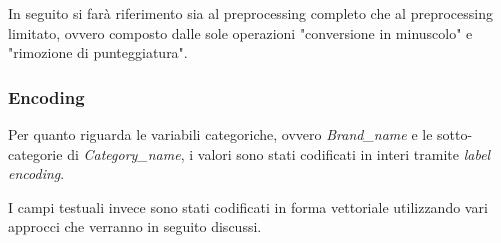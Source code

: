 In seguito si farà riferimento sia al preprocessing completo che al preprocessing
limitato, ovvero composto dalle sole operazioni "conversione in minuscolo" e
"rimozione di punteggiatura".

\subsubsection{Encoding}

Per quanto riguarda le variabili categoriche, ovvero \textit{Brand\_name} e le
sotto-categorie di \textit{Category\_name},
i valori sono stati codificati in interi tramite \textit{label encoding}.

I campi testuali invece sono stati codificati in forma vettoriale utilizzando
vari approcci che verranno in seguito discussi.


